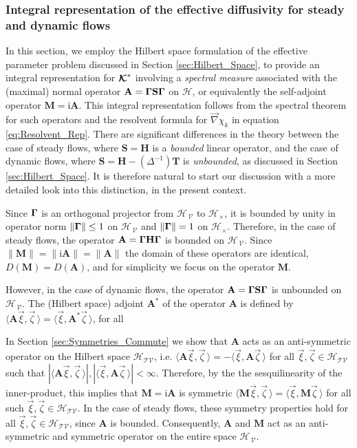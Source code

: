 \documentclass[11pt]{amsart}
\newcommand{\I}{\mathrm{i}}
\newcommand{\Mb}{\mathbf{M}}
\newcommand{\Tb}{\mathbf{T}}
\newcommand{\Hb}{\mathbf{H}}
\newcommand{\Sb}{\mathbf{S}}
\newcommand{\Ab}{\mathbf{A}}
\newcommand\Kbc{\mbox{\boldmath${\mathcal{K}}$}}
\newcommand{\Tc}{\mathcal{T}}
\newcommand{\Vc}{\mathcal{V}}
\newcommand{\Hs}{\mathscr{H}}
\newcommand\bGamma{\mbox{\boldmath${\Gamma}$}}
\begin{document}
\subsubsection{Integral representation of the effective diffusivity
  for steady and dynamic flows}\label{sec:Integral_Rep}
%
In this section, we employ the Hilbert space formulation of the
effective parameter problem discussed in Section
\ref{sec:Hilbert_Space}, to provide an integral representation for
$\Kbc^*$ involving a \emph{spectral measure} associated with the
(maximal) normal operator $\Ab=\bGamma\Sb\bGamma$ on
$\Hs$, or equivalently the self-adjoint operator
$\Mb=\I\Ab$. This integral representation follows from the spectral
theorem for such operators \cite{Reed-1980,Stone:64} and the resolvent 
formula for $\vec{\nabla}\chi_k$ in equation \eqref{eq:Resolvent_Rep}. There
are significant differences in the theory between the case of steady 
flows, where $\Sb=\Hb$ is a \emph{bounded} linear operator, and the
case of dynamic flows, where $\Sb=\Hb-(\Delta^{-1})\Tb$ is 
\emph{unbounded}, as discussed in Section \ref{sec:Hilbert_Space}. It
is therefore natural to start our discussion with a more detailed look
into this distinction, in the present context.      





Since $\bGamma$ is an orthogonal projector from $\Hs_{\,\Vc}$ to
$\Hs_\times$, it is bounded by unity in operator norm $\|\bGamma\|\leq1$ on
$\Hs_{\,\Vc}$ and $\|\bGamma\|=1$ on $\Hs_\times$. Therefore, in the case of
steady flows, the operator $\Ab=\bGamma\Hb\bGamma$ is bounded on
$\Hs_{\,\Vc}$. Since $\|\Mb\|=\|\I\Ab\|=\|\Ab\|$ the domain of these
operators are identical, $D(\Mb)=D(\Ab)$, and for simplicity we focus  
on the operator $\Mb$. 



However, in the
case of dynamic flows, the 
operator $\Ab=\bGamma\Sb\bGamma$ is unbounded on $\Hs_{\,\Vc}$. The
(Hilbert space) adjoint $\Ab^*$ of the operator $\Ab$ is defined by
$\langle\Ab\vec{\xi},\vec{\zeta}\,\rangle=\langle\vec{\xi},\Ab^*\vec{\zeta}\,\rangle$, for all  

In
Section \ref{sec:Symmetries_Commute} we show that $\Ab$ acts as an
anti-symmetric operator on the Hilbert space $\Hs_{\Tc\Vc}$,
i.e. $\langle\Ab\vec{\xi},\vec{\zeta}\,\rangle=-\langle\vec{\xi},\Ab\vec{\zeta}\,\rangle$ for all
$\vec{\xi},\vec{\zeta}\in\Hs_{\Tc\Vc}$ such that
$|\langle\Ab\vec{\xi},\vec{\zeta}\,\rangle|,|\langle\vec{\xi},\Ab\vec{\zeta}\,\rangle|<\infty$. Therefore, by
the the sesquilinearity of the inner-product, this implies that
$\Mb=\I\Ab$ is symmetric
$\langle\Mb\vec{\xi},\vec{\zeta}\,\rangle=\langle\vec{\xi},\Mb\vec{\zeta}\,\rangle$ for all such
$\vec{\xi},\vec{\zeta}\in\Hs_{\Tc\Vc}$. In the case of steady flows, these
symmetry properties hold for all $\vec{\xi},\vec{\zeta}\in\Hs_{\Tc\Vc}$, since 
$\Ab$ is bounded. Consequently, $\Ab$ and $\Mb$ act as an
anti-symmetric and symmetric operator on the entire space
$\Hs_{\,\Vc}$.
\end{document}
